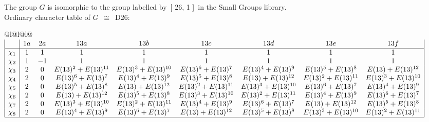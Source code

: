 \documentclass[varwidth=\maxdimen,border=10]{standalone}
\begin{document}
The group $G$ is isomorphic to the group labelled by\ [ 26, 1 ]\ in the Small Groups library.\\
Ordinary character table of $G$\ $\cong$\ D26:\\
\begin{center}
\begin{tabular}{@{}l@{}l@{}l@{}}
\hline
\(\begin{array}{|l|cccccccc|}
  & 1a & 2a & 13a & 13b & 13c & 13d & 13e & 13f\\ \hline
\chi_{1} & 1 & 1 & 1 & 1 & 1 & 1 & 1 & 1\\
\chi_{2} & 1 & -1 & 1 & 1 & 1 & 1 & 1 & 1\\
\chi_{3} & 2 & 0 & E(13)^{2}+E(13)^{11} & E(13)^{3}+E(13)^{10} & E(13)^{6}+E(13)^{7} & E(13)^{4}+E(13)^{9} & E(13)^{5}+E(13)^{8} & E(13)+E(13)^{12}\\
\chi_{4} & 2 & 0 & E(13)^{6}+E(13)^{7} & E(13)^{4}+E(13)^{9} & E(13)^{5}+E(13)^{8} & E(13)+E(13)^{12} & E(13)^{2}+E(13)^{11} & E(13)^{3}+E(13)^{10}\\
\chi_{5} & 2 & 0 & E(13)^{5}+E(13)^{8} & E(13)+E(13)^{12} & E(13)^{2}+E(13)^{11} & E(13)^{3}+E(13)^{10} & E(13)^{6}+E(13)^{7} & E(13)^{4}+E(13)^{9}\\
\chi_{6} & 2 & 0 & E(13)+E(13)^{12} & E(13)^{5}+E(13)^{8} & E(13)^{3}+E(13)^{10} & E(13)^{2}+E(13)^{11} & E(13)^{4}+E(13)^{9} & E(13)^{6}+E(13)^{7}\\
\chi_{7} & 2 & 0 & E(13)^{3}+E(13)^{10} & E(13)^{2}+E(13)^{11} & E(13)^{4}+E(13)^{9} & E(13)^{6}+E(13)^{7} & E(13)+E(13)^{12} & E(13)^{5}+E(13)^{8}\\
\chi_{8} & 2 & 0 & E(13)^{4}+E(13)^{9} & E(13)^{6}+E(13)^{7} & E(13)+E(13)^{12} & E(13)^{5}+E(13)^{8} & E(13)^{3}+E(13)^{10} & E(13)^{2}+E(13)^{11}\\
\hline
\end{array}\)\\
\end{tabular}
\end{center}
\end{document}
